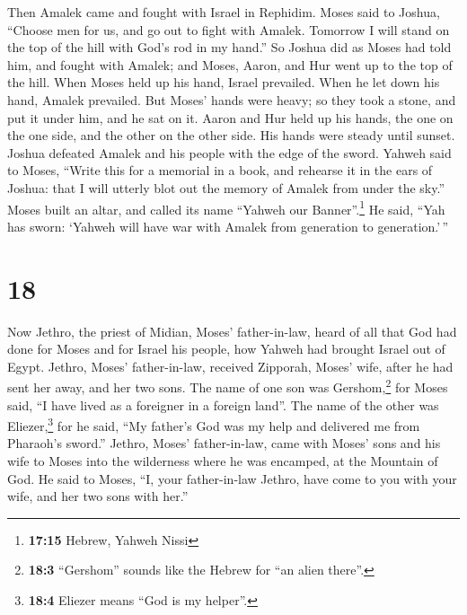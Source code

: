  Then Amalek came and fought with Israel in Rephidim.
 Moses said to Joshua, ``Choose men for us, and go out to
fight with Amalek. Tomorrow I will stand on the top of the hill with
God's rod in my hand.''  So Joshua did as Moses had told
him, and fought with Amalek; and Moses, Aaron, and Hur went up to the
top of the hill.  When Moses held up his hand, Israel
prevailed. When he let down his hand, Amalek prevailed. 
But Moses' hands were heavy; so they took a stone, and put it under him,
and he sat on it. Aaron and Hur held up his hands, the one on the one
side, and the other on the other side. His hands were steady until
sunset.  Joshua defeated Amalek and his people with the
edge of the sword.  Yahweh said to Moses, ``Write this
for a memorial in a book, and rehearse it in the ears of Joshua: that I
will utterly blot out the memory of Amalek from under the sky.''
 Moses built an altar, and called its name ``Yahweh our
Banner''.\footnote{\textbf{17:15} Hebrew, Yahweh Nissi} 
He said, ``Yah has sworn: `Yahweh will have war with Amalek from
generation to generation.'\,''

\hypertarget{section-17}{%
\section{18}\label{section-17}}

 Now Jethro, the priest of Midian, Moses' father-in-law,
heard of all that God had done for Moses and for Israel his people, how
Yahweh had brought Israel out of Egypt.  Jethro, Moses'
father-in-law, received Zipporah, Moses' wife, after he had sent her
away,  and her two sons. The name of one son was
Gershom,\footnote{\textbf{18:3} ``Gershom'' sounds like the Hebrew for
  ``an alien there''.} for Moses said, ``I have lived as a foreigner in
a foreign land''.  The name of the other was
Eliezer,\footnote{\textbf{18:4} Eliezer means ``God is my helper''.} for
he said, ``My father's God was my help and delivered me from Pharaoh's
sword.''  Jethro, Moses' father-in-law, came with Moses'
sons and his wife to Moses into the wilderness where he was encamped, at
the Mountain of God.  He said to Moses, ``I, your
father-in-law Jethro, have come to you with your wife, and her two sons
with her.''

